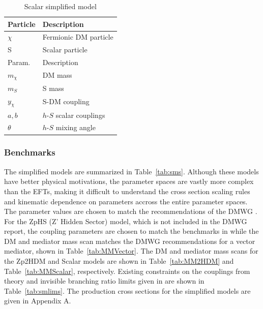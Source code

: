 \begin{table}[htbH]
\begin{center}
\begin{tabular}{ l | l}
\hline
Particle & Description \\
\hline
$\chi$ & Fermionic DM particle \\
S & Scalar particle \\
\hline
Param. & Description \\
\hline
$m_\chi$ & DM mass \\
$m_{S}$ & S mass \\
$y_\chi$ & S-DM coupling \\
$a, b$ & $h$-$S$ scalar couplings \\
$\theta$ & $h$-$S$ mixing angle \\
\hline
\end{tabular}
\caption{Scalar simplified model}\label{tab:Scalar}
\end{center}
\end{table}


\subsubsection{Benchmarks}

The simplified models are summarized in Table~\ref{tab:sms}. Although these models have better physical motivations, the parameter spaces are vastly more complex than the EFTs, making it difficult to understand the cross section scaling rules and kinematic dependence on parameters accross the entire parameter spaces. The parameter values are chosen to match the recommendations of the DMWG \cite{Abercrombie:2015wmb}. For the ZpHS (Z' Hidden Sector) model, which is not included in the DMWG report, the coupling parameters are chosen to match the benchmarks in \cite{Carpenter:2013xra} while the DM and mediator mass scan matches the DMWG recommendations for a vector mediator, shown in Table~\ref{tab:MMVector}. The DM and mediator mass scans for the Zp2HDM and Scalar models are shown in Table~\ref{tab:MM2HDM} and Table~\ref{tab:MMScalar}, respectively. Existing constraints on the couplings from theory and invisible branching ratio limits given in \cite{Carpenter:2013xra} are shown in Table~\ref{tab:smlims}. The production cross sections for the simplified models are given in Appendix A. 

